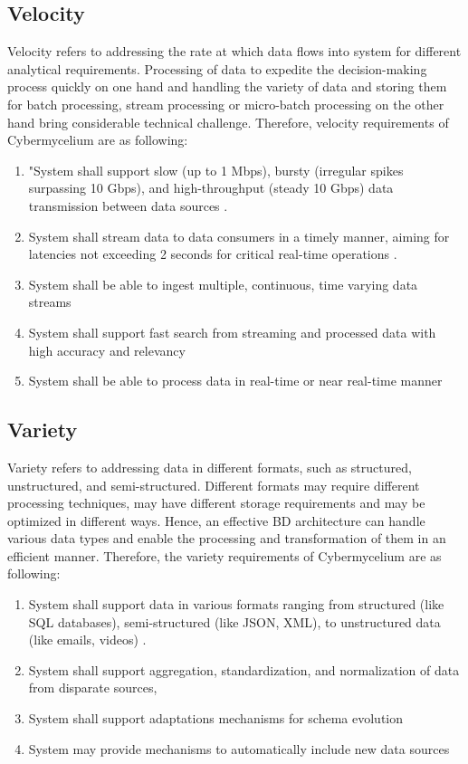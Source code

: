 \documentclass[review]{elsarticle}
\begin{document}
\subsection{Velocity}

Velocity refers to addressing the rate at which data flows into system for different analytical requirements. Processing of data to expedite the decision-making process quickly on one hand and handling the variety of data and storing them for batch processing, stream processing or micro-batch processing on the other hand bring considerable technical challenge. Therefore, velocity requirements of Cybermycelium are as following: 

\begin{enumerate}[label=\textbf{Vel-\arabic*}]
    \item "System shall support slow (up to 1 Mbps), bursty (irregular spikes surpassing 10 Gbps), and high-throughput (steady 10 Gbps) data transmission between data sources \cite{kleppmann2017designing}.
    \item System shall stream data to data consumers in a timely manner, aiming for latencies not exceeding 2 seconds for critical real-time operations \cite{ryzko2020modern}.
    \item System shall be able to ingest multiple, continuous, time varying data streams
    \item System shall support fast search from streaming and processed data with high accuracy and relevancy
    \item System shall be able to process data in real-time or near real-time manner
\end{enumerate}


\subsection{Variety}

Variety refers to addressing data in different formats, such as structured, unstructured, and semi-structured. Different formats may require different processing techniques, may have different storage requirements and may be optimized in different ways. Hence, an effective BD architecture can handle various data types and enable the processing and transformation of them in an efficient manner. Therefore, the variety requirements of Cybermycelium are as following: 

\begin{enumerate}[label=\textbf{Var-\arabic*}]
    \item System shall support data in various formats ranging from structured (like SQL databases), semi-structured (like JSON, XML), to unstructured data (like emails, videos) \cite{ryzko2020modern}.
    \item System shall support aggregation, standardization, and normalization of data from disparate sources,
    \item System shall support adaptations mechanisms for schema evolution
    \item System may provide mechanisms to automatically include new data sources
\end{enumerate}
\end{document}
